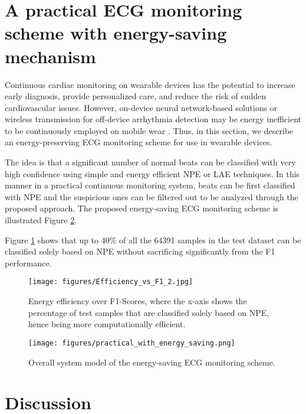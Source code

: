 \documentclass[journal,transmag]{IEEEtran}
\begin{document}
\section{A practical ECG monitoring scheme with energy-saving mechanism}
Continuous cardiac monitoring on wearable devices has the potential to increase early diagnosis, provide personalized care, and reduce the risk of sudden cardiovascular issues. However, on-device neural network-based solutions or wireless transmission for off-device arrhythmia detection may be energy inefficient to be continuously employed on mobile wear \cite{carrera2016ecg, mamaghanian2011compressed}. Thus, in this section, we describe an energy-preserving ECG monitoring scheme for use in wearable devices. 

The idea is that a significant number of normal beats can be classified with very high confidence using simple and energy efficient NPE or LAE techniques. In this manner in a practical continuous monitoring system, beats can be first classified with NPE and the suspicious ones can be filtered out to be analyzed through the proposed approach. The proposed energy-saving ECG monitoring scheme is illustrated Figure \ref{fig:practical_energy_saving}.

Figure \ref{fig:Efficiency_vs_F1} shows that up to 40\% of all the 64391 samples in the test dataset can be classified solely based on NPE without sacrificing significantly from the F1 performance.




\begin{figure}[!htbp]
    \captionsetup{font=footnotesize}
    \centering
    \texttt{[image: figures/Efficiency\_vs\_F1\_2.jpg]}
    \caption{Energy efficiency over F1-Scores, where the x-axis shows the percentage of test samples that are classified solely based on NPE, hence being more computationally efficient.}
    \label{fig:Efficiency_vs_F1}
\end{figure}

\begin{figure}[!htbp]
    \captionsetup{font=footnotesize}
    \centering
    \texttt{[image: figures/practical\_with\_energy\_saving.png]}
    \caption{Overall system model of the energy-saving ECG monitoring scheme.}
    \label{fig:practical_energy_saving}
\end{figure}


\section{Discussion}
\label{sec:discussion}
\end{document}
